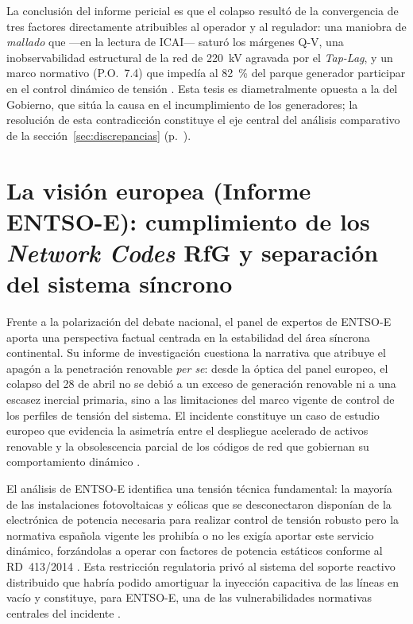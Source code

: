 La conclusión del informe pericial es que el colapso resultó de la
convergencia de tres factores directamente atribuibles al operador y al
regulador: una maniobra de \textit{mallado} que ---en la lectura de
ICAI--- saturó los márgenes Q-V, una inobservabilidad estructural de la
red de 220~kV agravada por el \textit{Tap-Lag}, y un marco normativo
(P.O.~7.4) que impedía al 82~\% del parque generador participar en el
control dinámico de tensión \cite{icai2025}. Esta tesis es
diametralmente opuesta a la del Gobierno, que sitúa la causa en el
incumplimiento de los generadores; la resolución de esta contradicción
constituye el eje central del análisis comparativo de la
sección~\ref{sec:discrepancias}
(p.~\pageref{sec:discrepancias}).


\section{La visión europea (Informe ENTSO-E): cumplimiento de los
\textit{Network Codes} RfG y separación del sistema síncrono}
\label{sec:vision_entsoe}

Frente a la polarización del debate nacional, el panel de expertos de
ENTSO-E aporta una perspectiva factual centrada en la estabilidad del
área síncrona continental. Su informe de investigación cuestiona la
narrativa que atribuye el apagón a la penetración renovable \textit{per se}:
desde la óptica del panel europeo, el colapso del 28 de abril no se
debió a un exceso de generación renovable ni a una escasez inercial
primaria, sino a las limitaciones del marco vigente de control de
los perfiles de tensión del sistema. El incidente constituye un caso
de estudio europeo que evidencia la asimetría entre el despliegue
acelerado de activos renovable y la obsolescencia parcial de los
códigos de red que gobiernan su comportamiento dinámico
\cite{entsoe2025,mitceepr2025}.

El análisis de ENTSO-E identifica una tensión técnica fundamental: la
mayoría de las instalaciones fotovoltaicas y eólicas que se
desconectaron disponían de la electrónica de potencia necesaria para
realizar control de tensión robusto pero la normativa española vigente
les prohibía o no les exigía aportar este servicio dinámico,
forzándolas a operar con factores de potencia estáticos conforme al
RD~413/2014 \cite{gobierno2025,entsoe2025}. Esta restricción
regulatoria privó al sistema del soporte reactivo distribuido que
habría podido amortiguar la inyección capacitiva de las líneas en
vacío y constituye, para ENTSO-E, una de las vulnerabilidades
normativas centrales del incidente \cite{entsoe2025}.

